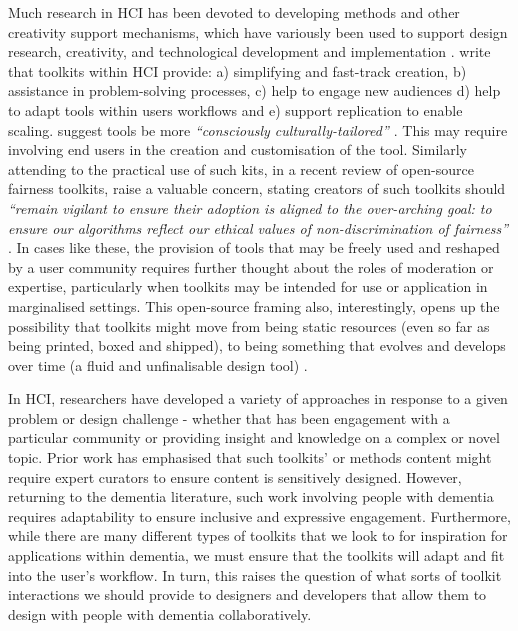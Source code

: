 Much research in HCI has been devoted to developing methods and other creativity support mechanisms, which have variously been used to support design research, creativity, and technological development and implementation \citep{broderick2020theory}. \cite{ledo2018evaluation} write that toolkits within HCI provide: a) simplifying and fast-track creation, b) assistance in problem-solving processes, c) help to engage new audiences d) help to adapt tools within users workflows and e) support replication to enable scaling. \cite{peters2020toolkits} suggest tools be more \textit{``consciously culturally-tailored'' \citep[pg.20]{peters2020toolkits}}. This may require involving end users in the creation and customisation of the tool. Similarly attending to the practical use of such kits, in a recent review of open-source fairness toolkits, \cite{lee2021landscape} raise a valuable concern, stating creators of such toolkits should \textit{``remain vigilant to ensure their adoption is aligned to the over-arching goal: to ensure our algorithms reflect our ethical values of non-discrimination of fairness'' \citep[pg.12]{lee2021landscape}}. In cases like these, the provision of tools that may be freely used and reshaped by a user community requires further thought about the roles of moderation or expertise, particularly when toolkits may be intended for use or application in marginalised settings. This open-source framing also, interestingly, opens up the possibility that toolkits might move from being static resources (even so far as being printed, boxed and shipped), to being something that evolves and develops over time (a fluid and unfinalisable design tool) \citep{braybrooke2020together}.

In HCI, researchers have developed a variety of approaches in response to a given problem or design challenge -  whether that has been engagement with a particular community or providing insight and knowledge on a complex or novel topic. Prior work has emphasised that such toolkits' or methods content might require expert curators to ensure content is sensitively designed. However, returning to the dementia literature, such work involving people with dementia requires adaptability to ensure inclusive and expressive engagement. Furthermore, while there are many different types of toolkits that we look to for inspiration for applications within dementia, we must ensure that the toolkits will adapt and fit into the user’s workflow. In turn, this raises the question of what sorts of toolkit interactions we should provide to designers and developers that allow them to design with people with dementia collaboratively.


